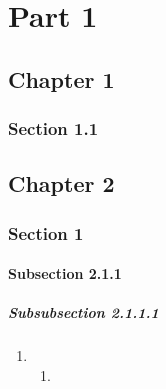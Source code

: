 \documentclass{book}
\begin{document}
\frontmatter{}


\part{Part 1}
\label{part:part-1}

\setcounter{chapter}{12}


\chapter{Chapter 1}
\label{cha:chapter-1}

\clearpage{}

\section{Section 1.1}
\label{sec:section-1-1}
\mainmatter


\chapter{Chapter 2}
\label{cha:chapter-2}

\clearpage{}

\section{Section 1}
\label{sec:section-2-1}

\clearpage{}

\subsection{Subsection 2.1.1}
\label{sec:subsection-2.1.1}

\clearpage{}

\subsubsection{Subsubsection 2.1.1.1}
\label{sec:subs-2.1.1.1}


\begin{enumerate}
\item {}
  \begin{enumerate}
  \item {}
  \end{enumerate}
\end{enumerate}
\end{document}
